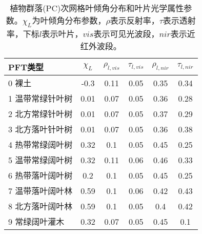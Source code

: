 \begin{table}[]
	\centering
	\caption{植物群落(PC)次网格叶倾角分布和叶片光学属性参数。$\chi_L$为叶倾角分布参数，$\rho$表示反射率，$\tau$表示透射率，下标$l$表示叶片，$vis$表示可见光波段，$nir$表示近红外波段。}
	\label{tab:PC叶倾角分布和叶片光学属性参数}
    \begin{tabular}{@{}lccccc@{}}
    \toprule
    PFT类型       & $\chi_L$ & $\rho_{l,vis}$ & $\tau_{l,vis}$ & $\rho_{l,nir}$ & $\tau_{l,nir}$ \\ \midrule
    0 裸土        & -0.3                   & 0.11                           & 0.05                           & 0.35                           & 0.34                            \\
    1 温带常绿针叶树   & 0.01                   & 0.07                           & 0.05                           & 0.36                           & 0.28                            \\
    2 北方常绿针叶树   & 0.01                   & 0.07                           & 0.05                           & 0.37                           & 0.29                            \\
    3 北方落叶针叶树   & 0.01                   & 0.07                           & 0.05                           & 0.36                           & 0.38                            \\
    4 热带常绿阔叶树   & 0.32                   & 0.1                            & 0.05                           & 0.45                           & 0.25                            \\
    5 温带常绿阔叶树   & 0.32                   & 0.11                           & 0.06                           & 0.46                           & 0.33                            \\
    6 热带落叶阔叶树   & 0.2                    & 0.1                            & 0.05                           & 0.45                           & 0.25                            \\
    7 温带落叶阔叶林   & 0.59                   & 0.1                            & 0.06                           & 0.42                           & 0.43                            \\
    8 北方落叶阔叶林   & 0.59                   & 0.1                            & 0.05                           & 0.4                            & 0.42                            \\
    9 常绿阔叶灌木    & 0.32                   & 0.07                           & 0.05                           & 0.45                           & 0.1                             \\

\end{tabular}
\end{table}
